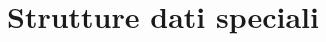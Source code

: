 
\ifsubfile
\pagestyle{plain}
\setcounter{chapter}{9}


\fi
\chapter{Strutture dati speciali}

\ifsubfile

\fi
